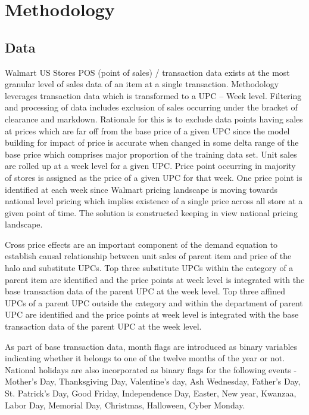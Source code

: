 \section{Methodology}
\label{sec:methodology}
\subsection{Data}
Walmart US Stores POS (point of sales) / transaction data exists at the most granular level of sales data of an item at 
a single transaction. Methodology leverages transaction data which is transformed to a UPC – Week level. Filtering and 
processing of data includes exclusion of sales occurring under the bracket of clearance and markdown. Rationale for 
this is to exclude data points having sales at prices which are far off from the base price of a given UPC since the 
model building for impact of price is accurate when changed in some delta range of the base price which comprises major 
proportion of the training data set. Unit sales are rolled up at a week level for a given UPC. Price point occurring 
in majority of stores is assigned as the price of a given UPC for that week. One price point is identified at each week 
since Walmart pricing landscape is moving towards national level pricing which implies existence of a single price across 
all store at a given point of time. The solution is constructed keeping in view national pricing landscape.

Cross price effects are an important component of the demand equation to establish causal relationship between unit 
sales of parent item and price of the halo and substitute UPCs. Top three substitute UPCs within the category of a parent 
item are identified and the price points at week level is integrated with the base transaction data of the parent UPC at 
the week level. Top three affined UPCs of a parent UPC outside the category and within the department of parent UPC are 
identified and the price points at week level is integrated with the base transaction data of the parent UPC at the week level.

As part of base transaction data, month flags are introduced as binary variables indicating whether it belongs to one of 
the twelve months of the year or not. National holidays are also incorporated as binary flags for the following events 
- Mother’s Day, Thanksgiving Day, Valentine’s day, Ash Wednesday, Father’s Day, St. Patrick’s Day, Good Friday, Independence Day,
 Easter, New year, Kwanzaa, Labor Day, Memorial Day, Christmas, Halloween, Cyber Monday.

